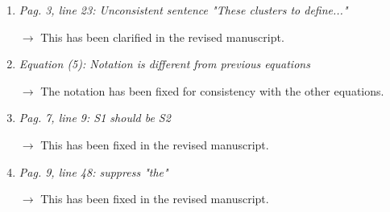 \documentclass[10pt]{article}
\begin{document}
\begin{enumerate}
\item \emph{Pag. 3, line 23: Unconsistent sentence "These clusters to define..."}

$\rightarrow$
This has been clarified in the revised manuscript.

\item \emph{Equation (5): Notation is different from previous equations}

$\rightarrow$
The notation has been fixed for consistency with the other equations.

\item \emph{Pag. 7, line 9: S1 should be S2}

$\rightarrow$
This has been fixed in the revised manuscript.

\item \emph{Pag. 9, line 48: suppress "the"}

$\rightarrow$
This has been fixed in the revised manuscript.

\end{enumerate}
\end{document}
